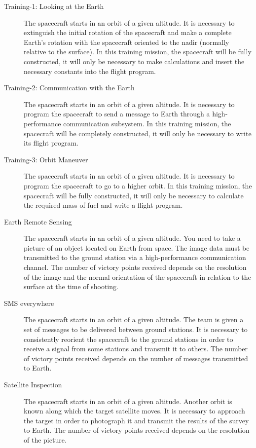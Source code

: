 \documentclass[12pt,a4paper]{article}
\begin{document}
\begin{description}
    \item[Training-1: Looking at the Earth] The spacecraft starts in an orbit of a given altitude. It is necessary to extinguish the initial rotation of the spacecraft and make a complete Earth's rotation with the spacecraft oriented to the nadir (normally relative to the surface). In this training mission, the spacecraft will be fully constructed, it will only be necessary to make calculations and insert the necessary constants into the flight program.
   \item[Training-2: Communication with the Earth] The spacecraft starts in an orbit of a given altitude. It is necessary to program the spacecraft to send a message to Earth through a high-performance communication subsystem. In this training mission, the spacecraft will be completely constructed, it will only be necessary to write its flight program.
   \item[Training-3: Orbit Maneuver] The spacecraft starts in an orbit of a given altitude. It is necessary to program the spacecraft to go to a higher orbit. In this training mission, the spacecraft will be fully constructed, it will only be necessary to calculate the required mass of fuel and write a flight program.
   \item[Earth Remote Sensing] The spacecraft starts in an orbit of a given altitude. You need to take a picture of an object located on Earth from space. The image data must be transmitted to the ground station via a high-performance communication channel. The number of victory points received depends on the resolution of the image and the normal orientation of the spacecraft in relation to the surface at the time of shooting.
   \item[SMS everywhere] The spacecraft starts in an orbit of a given altitude. The team is given a set of messages to be delivered between ground stations. It is necessary to consistently reorient the spacecraft to the ground stations in order to receive a signal from some stations and transmit it to others. The number of victory points received depends on the number of messages transmitted to Earth.
   \item[Satellite Inspection] The spacecraft starts in an orbit of a given altitude. Another orbit is known along which the target satellite moves. It is necessary to approach the target in order to photograph it and transmit the results of the survey to Earth. The number of victory points received depends on the resolution of the picture.

\end{description}
\end{document}
